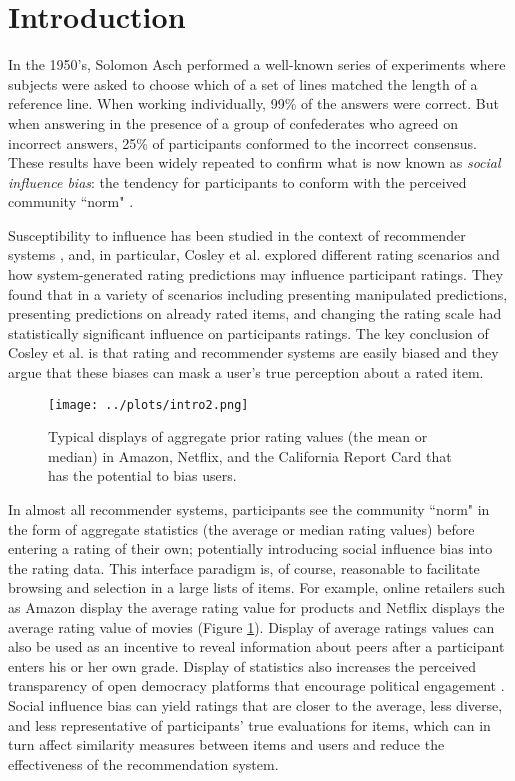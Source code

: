 \section{Introduction}
In the 1950's, Solomon Asch performed a well-known series of experiments 
\cite{asch1956studies, asch1955opinions, bond1996culture} where
subjects were asked to choose which of a set of lines matched the
length of a reference line.  
When working individually, 99\% of the answers were correct.  
But when answering in the presence of a group of confederates who agreed on incorrect answers, 25\% of participants
conformed to the incorrect consensus.  
These results have been widely repeated to confirm what is now known as \emph{social influence bias}:
the tendency for participants to conform with the perceived community ``norm" \cite{demarzo2003persuasion,
moscovici1972social, wood2000attitude}.

Susceptibility to influence has been studied in the context of recommender systems \cite{cosley2003seeing}, and, in particular, Cosley et al. explored
different rating scenarios and how system-generated rating predictions may influence participant ratings.
They found that in a variety of scenarios including presenting manipulated predictions, presenting predictions on already rated items, and changing the rating scale had statistically significant influence on participants ratings.
The key conclusion of Cosley et al. is that rating and recommender systems are easily biased and they argue that these biases can mask a user's true
perception about a rated item.

\begin{figure}[t]
  \centering
    \texttt{[image: ../plots/intro2.png]}
      \caption{Typical displays of aggregate prior rating values (the mean or median) in Amazon, Netflix, and the California Report Card
that has the potential to bias users.}
      \label{grading-0}
      \vspace{-1.0em}
\end{figure}

In almost all recommender systems, participants see the community ``norm" in the form of 
aggregate statistics (the average or median rating values) before entering a rating of their own;
potentially introducing social influence bias into the rating data.
This interface paradigm is, of course, reasonable to facilitate browsing and selection in a large lists of items.
For example, online retailers such as Amazon display the average rating value
for products and Netflix displays the average rating value of movies
(Figure \ref{grading-0}).  Display of average ratings values can also be
used as an incentive\cite{jian2012incentive} to reveal information about
peers after a participant enters his or her own grade.  
Display of statistics also increases the perceived transparency of open democracy platforms that encourage political engagement
\cite{albors2008new,o2012transparency,noveck2008wiki}.
Social influence bias can yield ratings that are closer to the average, less diverse, and less representative of participants' true
evaluations for items, which can in turn affect similarity measures between items and users and reduce the effectiveness of the recommendation system. 

